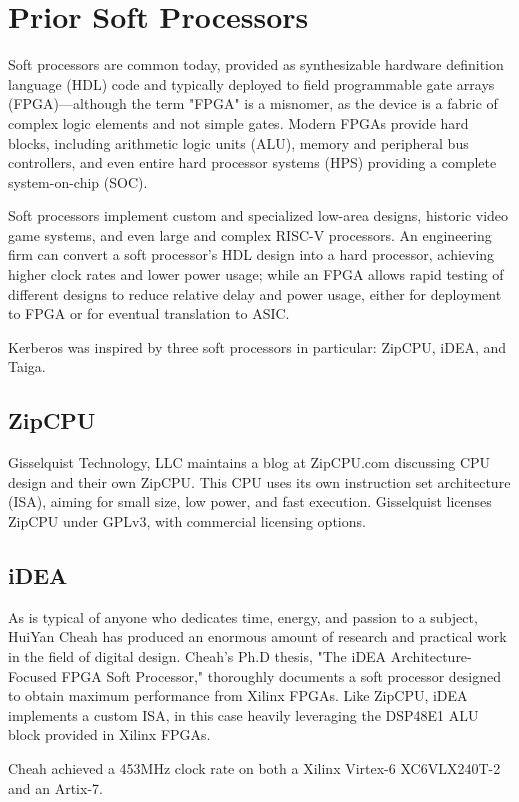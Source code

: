 \chapter{Prior Soft Processors}

Soft processors are common today, provided as synthesizable hardware definition language (HDL) code and typically deployed to field programmable gate arrays (FPGA)—although the term "FPGA" is a misnomer, as the device is a fabric of complex logic elements and not simple gates.  Modern FPGAs provide hard blocks, including arithmetic logic units (ALU), memory and peripheral bus controllers, and even entire hard processor systems (HPS) providing a complete system-on-chip (SOC).

Soft processors implement custom and specialized low-area designs, historic video game systems, and even large and complex RISC-V processors.  An engineering firm can convert a soft processor's HDL design into a hard processor, achieving higher clock rates and lower power usage; while an FPGA allows rapid testing of different designs to reduce relative delay and power usage, either for deployment to FPGA or for eventual translation to ASIC.

Kerberos was inspired by three soft processors in particular:  ZipCPU, iDEA, and Taiga.

\section{ZipCPU}
Gisselquist Technology, LLC maintains a blog at ZipCPU.com discussing CPU design and their own ZipCPU.  This CPU uses its own instruction set architecture (ISA), aiming for small size, low power, and fast execution.  Gisselquist licenses ZipCPU under GPLv3, with commercial licensing options.

\section{iDEA}
As is typical of anyone who dedicates time, energy, and passion to a subject, HuiYan Cheah has produced an enormous amount of research and practical work in the field of digital design.  Cheah's Ph.D thesis, "The iDEA Architecture-Focused FPGA Soft Processor," thoroughly documents a soft processor designed to obtain maximum performance from Xilinx FPGAs.  Like ZipCPU, iDEA implements a custom ISA, in this case heavily leveraging the DSP48E1 ALU block provided in Xilinx FPGAs.

Cheah achieved a 453MHz clock rate on both a Xilinx Virtex-6 XC6VLX240T-2 and an Artix-7.


